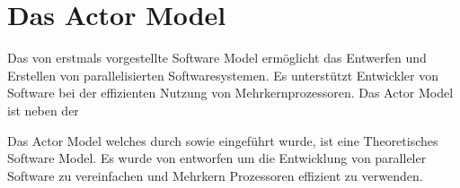 \chapter{Das Actor Model}
Das von \cite{hewitt1973session} erstmals vorgestellte Software Model ermöglicht das Entwerfen und Erstellen von parallelisierten Softwaresystemen. Es unterstützt Entwickler von Software bei der effizienten Nutzung von Mehrkernprozessoren. Das Actor Model ist neben der 

Das Actor Model welches durch \cite{hewitt1973session} sowie \cite{Agha1985ActorsSystems} eingeführt wurde, ist eine Theoretisches Software Model. 
Es wurde von \cite{hewitt1973session} entworfen um die Entwicklung von paralleler Software zu vereinfachen und Mehrkern Prozessoren effizient zu verwenden.